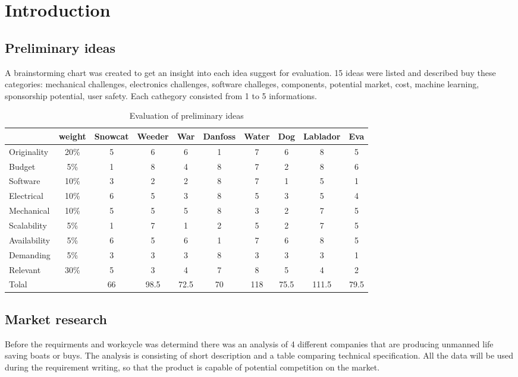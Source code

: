 \chapter{Introduction}

\section{Preliminary ideas}
A brainstorming chart was created to get an insight into each idea suggest for evaluation.
15 ideas were listed and described buy these categories: mechanical challenges, electronics challenges, 
software challeges, components, potential market, cost, machine learning, sponsorship potential, user safety.
Each cathegory consisted from 1 to 5 informations.


\begin{table}[h!]
    \centering
\begin{tabular}{|p{3cm }|c|c|c|c|c|c|c|c|c| }
    
\hline
 &weight& Snowcat & Weeder & War & Danfoss & Water & Dog & Lablador & Eva  \\
\hline
Originality & 20\% & 5 & 6 & 6 & 1 & 7 & 6 & 8 & 5  \\
Budget & 5\% & 1 & 8  & 4 & 8 & 7 & 2 & 8 & 6 \\
Software & 10\% & 3 & 2  & 2 & 8 & 7 & 1 & 5 & 1 \\
Electrical & 10\% & 6 & 5 & 3 & 8 & 5 & 3 & 5 & 4\\
Mechanical & 10\%& 5 & 5 & 5 & 8 & 3 & 2 & 7 & 5 \\
Scalability & 5\%& 1 & 7 & 1 & 2 & 5 & 2 & 7 & 5\\
Availability & 5\%& 6 & 5 & 6 & 1 & 7 & 6 & 8 & 5 \\
Demanding & 5\% & 3 & 3 & 3 & 8 & 3 & 3 & 3 & 1 \\
Relevant & 30\% & 5 & 3 & 4& 7& 8 & 5 & 4&2\\
\hline
Tolal & &66 & 98.5 & 72.5 & 70 & 118 & 75.5 & 111.5 & 79.5 \\


\hline
\end{tabular}
 \caption{Evaluation of preliminary ideas }
    \label{tab:Preliminary_ideas}

\end{table}
\newpage

\section{Market research}
Before the requirments and workcycle was determind  there was an analysis of  4 different companies that are producing unmanned life saving boats or buys. The analysis is consisting of short description and a table comparing technical specification. All the data will be used during the requirement writing, so that the product is capable of potential competition on the market.
